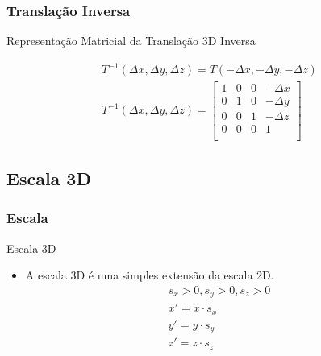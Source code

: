 \documentclass{beamer}
\begin{document}
\begin{frame}
\frametitle{Translação Inversa}

	\begin{block}{Representação Matricial da Translação 3D Inversa}
		
			\begin{eqnarray*}
				T^{-1}(\Delta x,\Delta y,\Delta z) =  T(- \Delta x,- \Delta y, -\Delta z)\\
			T^{-1}(\Delta x,\Delta y,\Delta z) = \begin{bmatrix}
					1	&	0	&	0	&	-\Delta x	\\
					0	&	1	&	0	&	-\Delta y	\\
					0	&	0	& 	1	&	-\Delta z	\\
					0	&	0	&	0	&	1		\\
				\end{bmatrix}
			\end{eqnarray*}
	\end{block}
\end{frame}

\subsection{Escala 3D}
\begin{frame}
\frametitle{Escala}

	\begin{block}{Escala 3D}
		\begin{itemize}
			\item A escala 3D é uma simples extensão da escala 2D.
			\begin{eqnarray*}
				s_x > 0, s_y > 0,s_z > 0 \\
				x' = x \cdot s_x \\
				y' = y \cdot s_y \\
				z' = z \cdot s_z \\
			\end{eqnarray*}
		\end{itemize}
	\end{block}
\end{frame}
\end{document}
